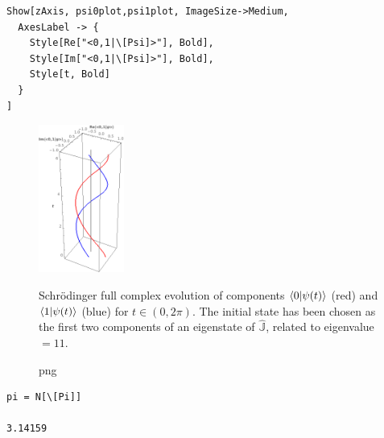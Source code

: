 \begin{Verbatim}
Show[zAxis, psi0plot,psi1plot, ImageSize->Medium,
  AxesLabel -> {
    Style[Re["<0,1|\[Psi]>"], Bold],
    Style[Im["<0,1|\[Psi]>"], Bold],
    Style[t, Bold]
  }
]
\end{Verbatim}
\begin{figure}[!h]
  \centering
  \includegraphics[width=0.25\textwidth]{img/qubit-evo-schrod.png}
  \caption[]{png}{
    Schr{\"o}dinger full complex evolution of components
    $\braket{0}{\psi(t)}$ (red) and 
    $\braket{1}{\psi(t)}$ (blue) for
    $t \in (0, 2\pi) $. The initial state
    has been chosen as the first two components of an eigenstate of
    $\hat{\mathbb{J}}$, related to eigenvalue $= 11$.
  }
\end{figure}

\begin{Verbatim}
pi = N[\[Pi]]

3.14159
\end{Verbatim}


